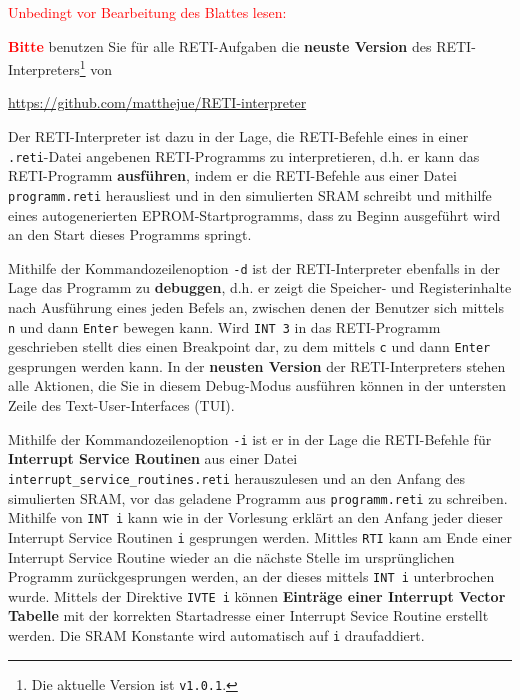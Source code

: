 \documentclass{article}
\newenvironment{adjustedminipage}[1]
  {\vspace{0.15cm}\begin{minipage}{#1}}
  {\end{minipage}}
\begin{document}
\textcolor{red}{Unbedingt vor Bearbeitung des Blattes lesen:}

{\LARGE \textbf{\textcolor{red}{Bitte}}} benutzen Sie für alle RETI-Aufgaben die \textbf{neuste Version} des RETI-Interpreters\footnote{Die aktuelle Version ist \texttt{v1.0.1}.} von

\begin{center}
	\begin{adjustedminipage}{0.9\textwidth}
    \url{https://github.com/matthejue/RETI-interpreter}
	\end{adjustedminipage}
\end{center}

Der RETI-Interpreter ist dazu in der Lage, die RETI-Befehle eines in einer \verb|.reti|-Datei angebenen RETI-Programms zu interpretieren, d.h. er kann das RETI-Programm \textbf{ausführen}, indem er die RETI-Befehle aus einer Datei \verb|programm.reti| herausliest und in den simulierten SRAM schreibt und mithilfe eines autogenerierten EPROM-Startprogramms, dass zu Beginn ausgeführt wird an den Start dieses Programms springt.

Mithilfe der Kommandozeilenoption \verb|-d| ist der RETI-Interpreter ebenfalls in der Lage das Programm zu \textbf{debuggen}, d.h. er zeigt die Speicher- und Registerinhalte nach Ausführung eines jeden Befels an, zwischen denen der Benutzer sich mittels \verb|n| und dann \verb|Enter| bewegen kann. Wird \verb|INT 3| in das RETI-Programm geschrieben stellt dies einen Breakpoint dar, zu dem mittels \verb|c| und dann \verb|Enter| gesprungen werden kann. In der \textbf{neusten Version} der RETI-Interpreters stehen alle Aktionen, die Sie in diesem Debug-Modus ausführen können in der untersten Zeile des Text-User-Interfaces (TUI).

Mithilfe der Kommandozeilenoption \verb|-i| ist er in der Lage die RETI-Befehle für \textbf{Interrupt Service Routinen} aus einer Datei \verb|interrupt_service_routines.reti| herauszulesen und an den Anfang des simulierten SRAM, vor das geladene Programm aus \verb|programm.reti| zu schreiben. Mithilfe von \verb|INT i| kann wie in der Vorlesung erklärt an den Anfang jeder dieser Interrupt Service Routinen \verb|i| gesprungen werden. Mittles \verb|RTI| kann am Ende einer Interrupt Service Routine wieder an die nächste Stelle im ursprünglichen Programm zurückgesprungen werden, an der dieses mittels \verb|INT i| unterbrochen wurde. Mittels der Direktive \verb|IVTE i| können \textbf{Einträge einer Interrupt Vector Tabelle} mit der korrekten Startadresse einer Interrupt Sevice Routine erstellt werden. Die SRAM Konstante wird automatisch auf \verb|i| draufaddiert.
\end{document}
